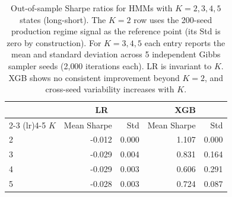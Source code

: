 \begin{table}[H]
\centering
\small
\begin{tabular}{l r r r r}
\toprule
 & \multicolumn{2}{c}{LR} & \multicolumn{2}{c}{XGB} \\
\cmidrule(lr){2-3} \cmidrule(lr){4-5}
$K$ & Mean Sharpe & Std & Mean Sharpe & Std \\
\midrule
2 & -0.012 & 0.000 & 1.107 & 0.000 \\
3 & -0.029 & 0.004 & 0.831 & 0.164 \\
4 & -0.029 & 0.003 & 0.606 & 0.291 \\
5 & -0.028 & 0.003 & 0.724 & 0.087 \\
\bottomrule
\end{tabular}
\caption{Out-of-sample Sharpe ratios for HMMs with $K = 2, 3, 4, 5$ states (long-short). The $K{=}2$ row uses the 200-seed production regime signal as the reference point (its Std is zero by construction). For $K = 3, 4, 5$ each entry reports the mean and standard deviation across 5 independent Gibbs sampler seeds (2{,}000 iterations each). LR is invariant to $K$. XGB shows no consistent improvement beyond $K = 2$, and cross-seed variability increases with $K$.}
\label{tab:multistate_hmm}
\end{table}